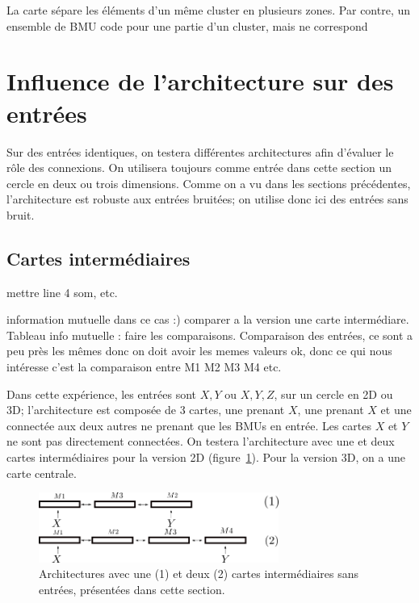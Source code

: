 La carte sépare les éléments d'un même cluster en plusieurs zones. Par contre, un ensemble de BMU code pour une partie d'un cluster, mais ne correspond  


\section{Influence de l'architecture sur des entrées}

Sur des entrées identiques, on testera différentes architectures afin d'évaluer le rôle des connexions. On utilisera toujours comme entrée dans cette section un cercle en deux ou trois dimensions. 
Comme on a vu dans les sections précédentes, l'architecture est robuste aux entrées bruitées; on utilise donc ici des entrées sans bruit. 

\subsection{Cartes intermédiaires}
mettre line 4 som, etc. 

information mutuelle dans ce cas :) comparer a la version une carte intermédiare. 
Tableau info mutuelle : faire les comparaisons. Comparaison des entrées, ce sont a peu près les mêmes donc on doit avoir les memes valeurs ok, donc ce qui nous intéresse c'est la comparaison entre M1 M2 M3 M4 etc. 

Dans cette expérience, les entrées sont $X,Y$ ou $X,Y,Z$, sur un cercle en 2D ou 3D; l'architecture est composée de 3 cartes, une prenant $X$, une prenant $X$ et une connectée aux deux autres ne prenant que les BMUs en entrée. Les cartes $X$ et $Y$ ne sont pas directement connectées. On testera l'architecture avec une et deux cartes intermédiaires pour la version 2D (figure~\ref{fig:archi_intermediaire}).
Pour la version 3D, on a une carte centrale. 

\begin{figure}[h!]
\includegraphics[width=0.7\textwidth]{archi_intermediaire.png}
\caption{Architectures avec une (1) et deux (2) cartes intermédiaires sans entrées, présentées dans cette section. }
\label{fig:archi_intermediaire}
\end{figure}

